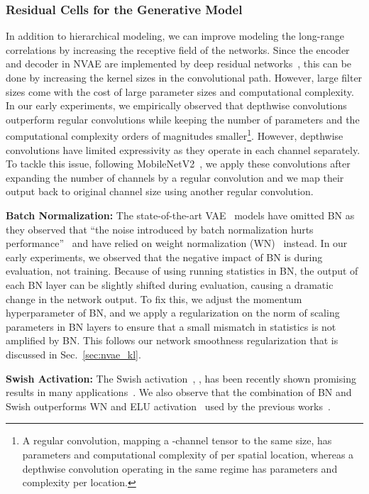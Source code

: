 \documentclass{article}
\begin{document}
\subsubsection{Residual Cells for the Generative Model}
In addition to hierarchical modeling, we can improve modeling the long-range correlations by increasing the receptive field of the networks. Since the encoder and decoder in NVAE are implemented by deep residual networks~\cite{he2016deep}, this can be done by increasing the kernel sizes in the convolutional path. However, large filter sizes come with the cost of large parameter sizes and computational complexity. In our early experiments, we empirically observed that depthwise convolutions outperform regular convolutions while keeping the number of parameters and the computational complexity orders of magnitudes smaller\footnote{A  regular convolution, mapping a -channel tensor to the same size, has  parameters and computational complexity of  per spatial location, whereas a depthwise convolution operating in the same regime has  parameters and  complexity per location.}. However, depthwise convolutions have limited expressivity as they operate in each channel separately. To tackle this issue, following MobileNetV2~\cite{sandler2018mobilenetv2}, we apply these convolutions after expanding the number of channels by a  regular convolution and we map their output back to original channel size using another  regular convolution. 

\textbf{Batch Normalization:} The state-of-the-art VAE~\cite{kingma2016improved, maaloe2019biva} models have omitted BN as they observed that ``the noise introduced by batch normalization hurts performance''~\cite{kingma2016improved} and have relied on weight normalization (WN)~\cite{salimans16weight} instead. In our early experiments, we observed that the negative impact of BN is during evaluation, not training. Because of using running statistics in BN, the output of each BN layer can be slightly shifted during evaluation, causing a dramatic change in the network output. To fix this, we adjust the momentum hyperparameter of BN, and we apply a regularization on the norm of scaling parameters in BN layers to ensure that a small mismatch in statistics is not amplified by BN. This follows our network smoothness regularization that is discussed in Sec.~\ref{sec:nvae_kl}.

\textbf{Swish Activation:} The Swish activation~\cite{ramachandran2017swish}, , has been recently shown promising results in many applications~\cite{tan2019efficientnet, chen2019residualflows}. We also observe that the combination of BN and Swish outperforms WN and ELU activation~\cite{clevert2015fast} used by the previous works~\cite{kingma2016improved, maaloe2019biva}.
\end{document}
